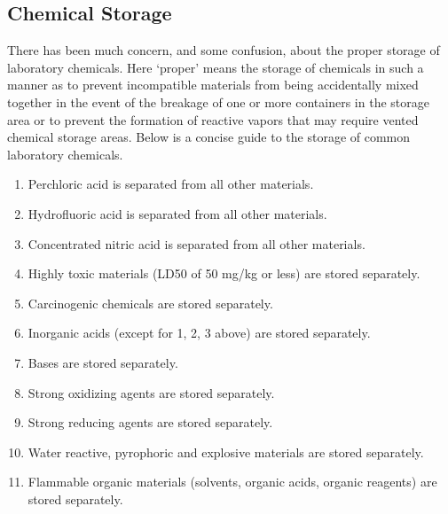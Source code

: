 \documentclass[letterpaper,10pt,english]{sphinxmanual}
\begin{document}
\subsection{Chemical Storage}
\label{\detokenize{Laboratory_Safety/Laboratory_Safety:chemical-storage}}
There has been much concern, and some confusion, about the proper storage of laboratory chemicals. Here ‘proper’ means the storage of chemicals in such a manner as to prevent incompatible materials from being accidentally mixed together in the event of the breakage of one or more containers in the storage area or to prevent the formation of reactive vapors that may require vented chemical storage areas. Below is a concise guide to the storage of common laboratory chemicals.
\begin{enumerate}
\item {} 
Perchloric acid is separated from all other materials.

\item {} 
Hydrofluoric acid is separated from all other materials.

\item {} 
Concentrated nitric acid is separated from all other materials.

\item {} 
Highly toxic materials (LD50 of 50 mg/kg or less) are stored separately.

\item {} 
Carcinogenic chemicals are stored separately.

\item {} 
Inorganic acids (except for 1, 2, 3 above) are stored separately.

\item {} 
Bases are stored separately.

\item {} 
Strong oxidizing agents are stored separately.

\item {} 
Strong reducing agents are stored separately.

\item {} 
Water reactive, pyrophoric and explosive materials are stored separately.

\item {} 
Flammable organic materials (solvents, organic acids, organic reagents) are stored separately.

\end{enumerate}
\end{document}
